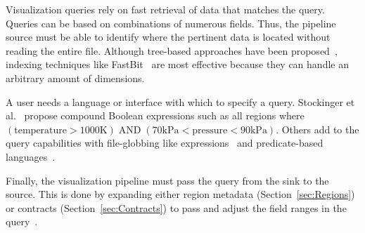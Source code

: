 \documentclass[journal,twocolumn,10pt,letterpaper,twoside]{IEEEtran}
\newcommand*{\lcite}[1]{~\cite{#1}}
\newcommand*{\scite}[1]{~\cite{#1}}
\newcommand{\etal}{et al.}
\begin{document}
Visualization queries rely on fast retrieval of data that matches the
query.  Queries can be based on combinations of numerous fields.  Thus, the
pipeline source must be able to identify where the pertinent data is
located without reading the entire file.  Although tree-based approaches
have been proposed\lcite{Chiang1998}, indexing techniques like
FastBit\lcite{FastBit,Wu2010} are most effective because they can handle an
arbitrary amount of dimensions.

A user needs a language or interface with which to specify a query.
Stockinger \etal\scite{Stockinger2005} propose compound Boolean expressions
such as all regions where $(\mathrm{temperature} > 1000\mathrm{K}) \;
\mathrm{AND} \; (70\mathrm{kPa} < \mathrm{pressure} < 90\mathrm{kPa})$.
Others add to the query capabilities with file-globbing like
expressions\lcite{Glatter2008} and predicate-based
languages\lcite{Johnson2009}.

Finally, the visualization pipeline must pass the query from the sink to
the source.  This is done by expanding either region metadata
(Section~\ref{sec:Regions}) or contracts (Section~\ref{sec:Contracts}) to
pass and adjust the field ranges in the query\lcite{Rubel2008}.
\end{document}

